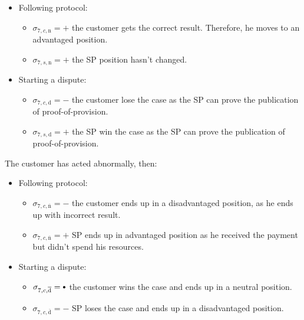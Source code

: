 \documentclass{ieeeaccess}
\newcommand\sbullet[1][.75]{\mathbin{\ThisStyle{\vcenter{\hbox{%
  \scalebox{#1}{$\SavedStyle\bullet$}}}}}%
}
\begin{document}
\begin{itemize}
\item
  Following protocol:

  \begin{itemize}
  
  \item
    \(\sigma_{7, c, \mathrm{n}} = +\) the customer gets the correct
    result. Therefore, he moves to an advantaged position.
  \item
    \(\sigma_{7, s, \mathrm{n}} = +\) the SP position hasn't changed.
  \end{itemize}
\item
  Starting a dispute:

  \begin{itemize}
  
  \item
    \(\sigma_{7, c, \mathrm{d}} = -\) the customer lose the case as the
    SP can prove the publication of proof-of-provision.
  \item
    \(\sigma_{7, s, \mathrm{d}} = +\) the SP win the case as the SP can
    prove the publication of proof-of-provision.
  \end{itemize}
\end{itemize}

The customer has acted abnormally, then:

\begin{itemize}
\item
  Following protocol:

  \begin{itemize}
  
  \item
    \(\sigma_{7, c, \overline{\mathrm{n}}} = -\) the customer ends up in a disadvantaged position, as he ends up with incorrect result.
  \item
    \(\sigma_{7, c, \overline{\mathrm{n}}} = +\) SP ends up in advantaged
    position as he received the payment but didn't spend his resources.
  \end{itemize}
\item
  Starting a dispute:

  \begin{itemize}
  
  \item
    \(\sigma_{7, c, \overline{\mathrm{d}}} = \sbullet\) the customer wins the case and ends up in a neutral position.
  \item
    \(\sigma_{7, c, \overline{\mathrm{d}}} = -\) SP loses the case and ends up in a disadvantaged position.
  \end{itemize}
\end{itemize}
\end{document}
